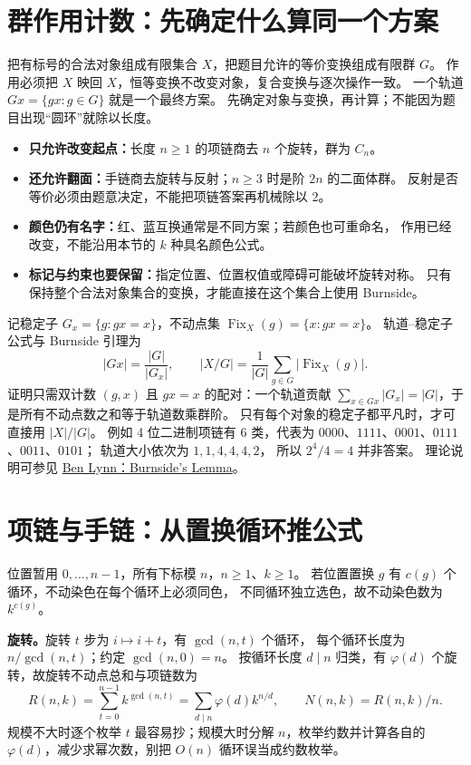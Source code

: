 \section{群作用计数：先确定什么算同一个方案}\label{knowledge-orbits-model}
把有标号的合法对象组成有限集合 $X$，把题目允许的等价变换组成有限群 $G$。
作用必须把 $X$ 映回 $X$，恒等变换不改变对象，复合变换与逐次操作一致。
一个轨道 $Gx=\{gx:g\in G\}$ 就是一个最终方案。
先确定对象与变换，再计算；不能因为题目出现“圆环”就除以长度。

\begin{itemize}
\item \textbf{只允许改变起点：}长度 $n\ge1$ 的项链商去 $n$ 个旋转，群为 $C_n$。
\item \textbf{还允许翻面：}手链商去旋转与反射；$n\ge3$ 时是阶 $2n$ 的二面体群。
反射是否等价必须由题意决定，不能把项链答案再机械除以 2。
\item \textbf{颜色仍有名字：}红、蓝互换通常是不同方案；若颜色也可重命名，
作用已经改变，不能沿用本节的 $k$ 种具名颜色公式。
\item \textbf{标记与约束也要保留：}指定位置、位置权值或障碍可能破坏旋转对称。
只有保持整个合法对象集合的变换，才能直接在这个集合上使用 Burnside。
\end{itemize}

记稳定子 $G_x=\{g:gx=x\}$，不动点集 $\operatorname{Fix}_X(g)=\{x:gx=x\}$。
轨道--稳定子公式与 Burnside 引理为
\[
|Gx|=\frac{|G|}{|G_x|},\qquad
|X/G|=\frac1{|G|}\sum_{g\in G}|\operatorname{Fix}_X(g)|.
\]
证明只需双计数 $(g,x)$ 且 $gx=x$ 的配对：一个轨道贡献
$\sum_{x\in Gx}|G_x|=|G|$，于是所有不动点数之和等于轨道数乘群阶。
只有每个对象的稳定子都平凡时，才可直接用 $|X|/|G|$。
例如 4 位二进制项链有 6 类，代表为
$0000$、$1111$、$0001$、$0111$、$0011$、$0101$；
轨道大小依次为 $1,1,4,4,4,2$，
所以 $2^4/4=4$ 并非答案。
理论说明可参见 \href{https://theory.stanford.edu/~blynn/polya/burnside.html}{Ben Lynn：Burnside's Lemma}。

\section{项链与手链：从置换循环推公式}\label{knowledge-orbits-dihedral}
位置暂用 $0,\ldots,n-1$，所有下标模 $n$，$n\ge1$、$k\ge1$。
若位置置换 $g$ 有 $c(g)$ 个循环，不动染色在每个循环上必须同色，
不同循环独立选色，故不动染色数为 $k^{c(g)}$。

\textbf{旋转。}旋转 $t$ 步为 $i\mapsto i+t$，有 $\gcd(n,t)$ 个循环，
每个循环长度为 $n/\gcd(n,t)$；约定 $\gcd(n,0)=n$。
按循环长度 $d\mid n$ 归类，有 $\varphi(d)$ 个旋转，故旋转不动点总和与项链数为
\[
R(n,k)=\sum_{t=0}^{n-1}k^{\gcd(n,t)}
      =\sum_{d\mid n}\varphi(d)k^{n/d},\qquad N(n,k)=R(n,k)/n.
\]
规模不大时逐个枚举 $t$ 最容易抄；规模大时分解 $n$，枚举约数并计算各自的
$\varphi(d)$，减少求幂次数，别把 $O(n)$ 循环误当成约数枚举。

